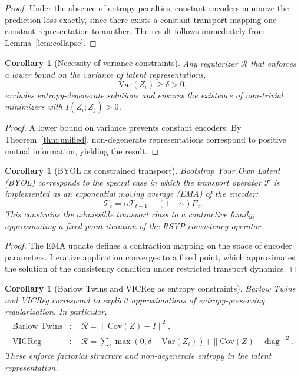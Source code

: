 \documentclass[12pt, oneside]{article}
\newtheorem{corollary}[definition]{Corollary}
\begin{document}
\begin{proof}
Under the absence of entropy penalties, constant encoders minimize the prediction loss exactly, since there exists a constant transport mapping one constant representation to another. The result follows immediately from Lemma~\ref{lem:collapse}.
\end{proof}

\begin{corollary}[Necessity of variance constraints]
\label{cor:variance}
Any regularizer $\widetilde{\mathcal{R}}$ that enforces a lower bound on the variance of latent representations,
\[
\mathrm{Var}(Z_i) \geq \delta > 0,
\]
excludes entropy-degenerate solutions and ensures the existence of non-trivial minimizers with $I(Z_i;Z_j) > 0$.
\end{corollary}

\begin{proof}
A lower bound on variance prevents constant encoders. By Theorem~\ref{thm:unified}, non-degenerate representations correspond to positive mutual information, yielding the result.
\end{proof}

\begin{corollary}[BYOL as constrained transport]
\label{cor:byol}
Bootstrap Your Own Latent (BYOL) corresponds to the special case in which the transport operator $\mathcal{T}$ is implemented as an exponential moving average (EMA) of the encoder:
\[
\mathcal{T}_t = \alpha \mathcal{T}_{t-1} + (1-\alpha) E_t.
\]
This constrains the admissible transport class to a contractive family, approximating a fixed-point iteration of the RSVP consistency operator.
\end{corollary}

\begin{proof}
The EMA update defines a contraction mapping on the space of encoder parameters. Iterative application converges to a fixed point, which approximates the solution of the consistency condition under restricted transport dynamics.
\end{proof}

\begin{corollary}[Barlow Twins and VICReg as entropy constraints]
\label{cor:vicreg}
Barlow Twins and VICReg correspond to explicit approximations of entropy-preserving regularization. In particular,
\begin{align*}
\text{Barlow Twins} &:\quad \widetilde{\mathcal{R}} = \|\mathrm{Cov}(Z) - I\|^2, \\
\text{VICReg} &:\quad \widetilde{\mathcal{R}} = \sum_i \max(0, \delta - \mathrm{Var}(Z_i)) + \|\mathrm{Cov}(Z) - \mathrm{diag}\|^2.
\end{align*}
These enforce factorial structure and non-degenerate entropy in the latent representation.
\end{corollary}
\end{document}
